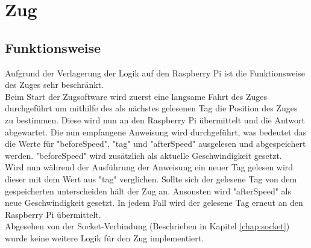 \chapter{Zug}
\section{Funktionsweise}

Aufgrund der Verlagerung der Logik auf den Raspberry Pi ist die Funktionsweise des Zuges sehr beschränkt.\\
Beim Start der Zugsoftware wird zuerst eine langsame Fahrt des Zuges durchgeführt um mithilfe des als nächstes gelesenen Tag die Position des Zuges zu bestimmen. Diese wird nun an den Raspberry Pi übermittelt und die Antwort abgewartet. Die nun empfangene Anweisung wird durchgeführt, was bedeutet das die Werte für "beforeSpeed", "tag" und "afterSpeed" ausgelesen und abgespeichert werden. "beforeSpeed" wird zusätzlich als aktuelle Geschwindigkeit gesetzt.\\
Wird nun während der Ausführung der Anweisung ein neuer Tag gelesen wird dieser mit dem Wert aus "tag" verglichen. Sollte sich der gelesene Tag von dem gespeicherten unterscheiden hält der Zug an. Ansonsten wird "afterSpeed" als neue Geschwindigkeit gesetzt. In jedem Fall wird der gelesene Tag erneut an den Raspberry Pi übermittelt.\\
Abgesehen von der Socket-Verbindung (Beschrieben in Kapitel \ref{chap:socket}) wurde keine weitere Logik für den Zug implementiert.

